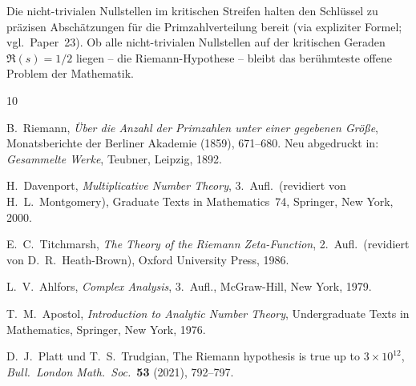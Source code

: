\documentclass[12pt,a4paper]{amsart}
\theoremstyle{definition}
\begin{document}
Die nicht-trivialen Nullstellen im kritischen Streifen halten den Schl\"ussel
zu pr\"azisen Absch\"atzungen f\"ur die Primzahlverteilung bereit
(via expliziter Formel; vgl.\ Paper~23).
Ob alle nicht-trivialen Nullstellen auf der kritischen Geraden $\Re(s) = 1/2$
liegen -- die Riemann-Hypothese -- bleibt das ber\"uhmteste offene Problem
der Mathematik.

\begin{thebibliography}{10}

B.~Riemann,
\emph{\"Uber die Anzahl der Primzahlen unter einer gegebenen Gr\"o\ss e},
Monatsberichte der Berliner Akademie (1859), 671--680.
Neu abgedruckt in: \emph{Gesammelte Werke}, Teubner, Leipzig, 1892.

H.~Davenport,
\emph{Multiplicative Number Theory}, 3.~Aufl.\
(revidiert von H.~L.~Montgomery),
Graduate Texts in Mathematics~74,
Springer, New York, 2000.

E.~C.~Titchmarsh,
\emph{The Theory of the Riemann Zeta-Function}, 2.~Aufl.\
(revidiert von D.~R.~Heath-Brown),
Oxford University Press, 1986.

L.~V.~Ahlfors,
\emph{Complex Analysis}, 3.~Aufl.,
McGraw-Hill, New York, 1979.

T.~M.~Apostol,
\emph{Introduction to Analytic Number Theory},
Undergraduate Texts in Mathematics,
Springer, New York, 1976.

D.~J.~Platt und T.~S.~Trudgian,
The Riemann hypothesis is true up to $3 \times 10^{12}$,
\emph{Bull.\ London Math.\ Soc.}\ \textbf{53} (2021), 792--797.

\end{thebibliography}
\end{document}
